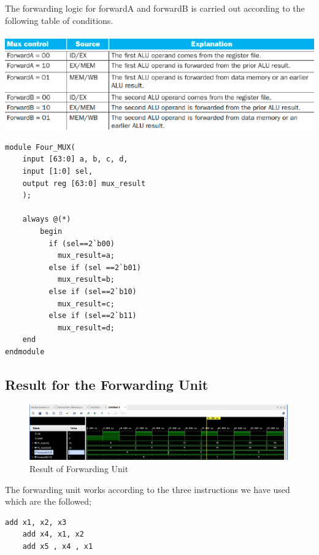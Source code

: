 \documentclass{article}
\begin{document}
The forwarding logic for forwardA and forwardB is carried out according to the following table of conditions.
\\ \\
\includegraphics*[width = 12.5 cm]{forwardingconditions.png}

\begin{lstlisting}[caption={Four MUX}, captionpos=b, language=RISC-V]
module Four_MUX(
    input [63:0] a, b, c, d, 
    input [1:0] sel, 
    output reg [63:0] mux_result
    );
    
    always @(*)
        begin
          if (sel==2`b00)
            mux_result=a;
          else if (sel ==2`b01)
            mux_result=b;
          else if (sel==2`b10)
            mux_result=c;
          else if (sel==2`b11)
            mux_result=d;    
    end 
endmodule
\end{lstlisting}

\subsection{Result for the Forwarding Unit}

\begin{figure}[h]
    \centering
    \includegraphics*[width = 13 cm]{forwarding.jpeg}
    \caption{Result of Forwarding Unit}
    \label{fig: label 4}
\end{figure}
    
The forwarding unit works according to the three instructions we have used which are the followed;

\begin{lstlisting}[caption={Arbitrary Set of instructions}, captionpos=b, language=RISC-V]
    add x1, x2, x3
    add x4, x1, x2
    add x5 , x4 , x1
\end{lstlisting}
\end{document}
